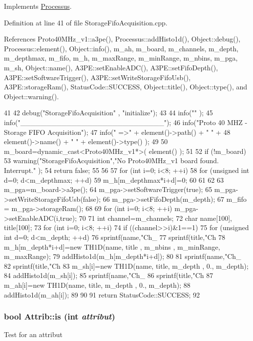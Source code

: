 Implements \hyperlink{classProcessus_aee88ad7b77ae7319cf8b128e9dd2ea11}{Processus}.

Definition at line 41 of file StorageFifoAcquisition.cpp.

References Proto40MHz\_\-v1::a3pe(), Processus::addHisto1d(), Object::debug(), Processus::element(), Object::info(), m\_\-ah, m\_\-board, m\_\-channels, m\_\-depth, m\_\-depthmax, m\_\-fifo, m\_\-h, m\_\-maxRange, m\_\-minRange, m\_\-nbins, m\_\-pga, m\_\-sh, Object::name(), A3PE::setEnableADC(), A3PE::setFifoDepth(), A3PE::setSoftwareTrigger(), A3PE::setWriteStorageFifoUsb(), A3PE::storageRam(), StatusCode::SUCCESS, Object::title(), Object::type(), and Object::warning().


\begin{DoxyCode}
41                                                 {
42   debug("StorageFifoAcquisition" , "initialize");
43 
44   info("" );
45   info("____________________________");
46   info("Proto 40 MHZ - Storage FIFO Acquisition");
47   info(" =>" + element()->path() + " " +
48        element()->name() + " " + element()->type() );
49 
50   m_board=dynamic_cast<Proto40MHz_v1*>( element() );
51 
52   if (!m_board){
53     warning("StorageFifoAcquisition","No Proto40MHz_v1 board found. Interrupt."  
      );
54     return false;
55   }
56 
57   for (int i=0; i<8; ++i){
58     for (unsigned int d=0; d<m_depthmax; ++d){
59       m_h[m_depthmax*i+d]=0;
60     }
61   }
62 
63   m_pga=m_board->a3pe();
64   m_pga->setSoftwareTrigger(true);
65   m_pga->setWriteStorageFifoUsb(false);
66   m_pga->setFifoDepth(m_depth);
67   m_fifo = m_pga->storageRam();
68 
69   for (int i=0; i<8; ++i) m_pga->setEnableADC(i,true);
70     
71   int channel=m_channels;
72   char name[100], title[100];
73   for (int i=0; i<8; ++i){
74     if ((channel>>i)&1==1){
75       for (unsigned int d=0; d<m_depth; ++d){
76     sprintf(name,"Ch_%
77     sprintf(title,"Ch %
78     m_h[m_depth*i+d]=new TH1D(name, title , m_nbins , m_minRange, m_maxRange);
79     addHisto1d(m_h[m_depth*i+d]);
80       }
81       sprintf(name,"Ch_%
82       sprintf(title,"Ch %
83       m_sh[i]=new TH1D(name, title, m_depth , 0., m_depth);
84       addHisto1d(m_sh[i]);
85       sprintf(name,"Ch_%
86       sprintf(title,"Ch %
87       m_ah[i]=new TH1D(name, title, m_depth , 0., m_depth);
88       addHisto1d(m_ah[i]);
89     }
90   }
91   return StatusCode::SUCCESS;
92 }
\end{DoxyCode}
\hypertarget{classAttrib_a704f26af560909ad22065083bb7d4c34}{
\subsubsection[{is}]{\setlength{\rightskip}{0pt plus 5cm}bool Attrib::is (int {\em attribut})}}
\label{classAttrib_a704f26af560909ad22065083bb7d4c34}
Test for an attribut 

